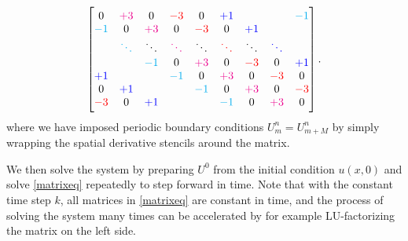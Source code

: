\begin{equation*}
\begin{bmatrix}
0           & \color{magenta} +3      & 0           & \color{red} -3      & 0           & \color{blue} +1      &             &             & \color{cyan} -1      \\
\color{cyan} -1      & 0           & \color{magenta} +3      & 0           & \color{red} -3      & 0           & \color{blue} +1      &             &             \\
            & \color{cyan} \ddots  & \ddots      & \color{magenta} \ddots  & \ddots      & \color{red} \ddots  & \ddots      & \color{blue} \ddots  &             \\
            &             & \color{cyan} -1      & 0           & \color{magenta} +3      & 0           & \color{red} -3      & 0           & \color{blue} +1      \\
\color{blue} +1      &             &             & \color{cyan} -1      & 0           & \color{magenta} +3      & 0           & \color{red} -3      & 0           \\
0           & \color{blue} +1      &             &             & \color{cyan} -1      & 0           & \color{magenta} +3      & 0           & \color{red} -3      \\
\color{red} -3      & 0           & \color{blue} +1      &             &             & \color{cyan} -1      & 0           & \color{magenta} +3      & 0           \\
\end{bmatrix}
.
\end{equation*}
where we have imposed periodic boundary conditions $U_m^n = U_{m+M}^n$ by simply wrapping the spatial derivative stencils around the matrix.

We then solve the system by preparing $U^0$ from the initial condition $u(x, 0)$ and solve \cref{matrixeq} repeatedly to step forward in time.
Note that with the constant time step $k$, all matrices in \cref{matrixeq} are constant in time, and the process of solving the system many times can be accelerated by for example LU-factorizing the matrix on the left side.

